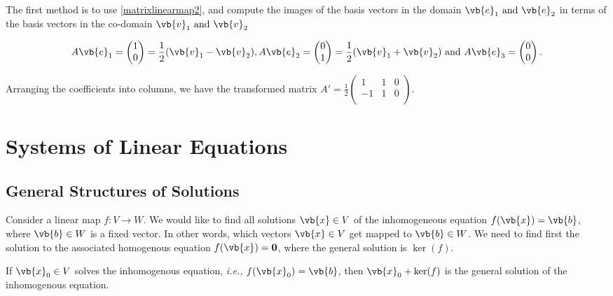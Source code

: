 \documentclass[a4paper,12pt]{report}
\begin{document}
{The first method is to use \cref{matrixlinearmap2}, and compute the images of the basis vectors in the domain \(\vb{e} _{1} \text { and } \vb{e} _{2} \) in terms of the basis vectors in the co-domain \(\vb{v} _{1} \text { and } \vb{v} _{2} \)

\begin{equation}
    A \vb{e} _{1} = \begin{pmatrix}
         1 \\
         0 \\
    \end{pmatrix} = \frac{1}{2}(\vb{v} _{1} - \vb{v} _{2}  ),  A\vb{e} _{2} = \begin{pmatrix}
         0 \\
         1 \\
    \end{pmatrix} = \frac{1}{2} (\vb{v} _{1}+ \vb{v} _{2}  ) \text { and } A\vb{e} _{3} = \begin{pmatrix}
         0 \\
         0 \\
    \end{pmatrix}.
\end{equation}

Arranging the coefficients into columns, we have the transformed matrix \(A' = \frac{1}{2} \begin{pmatrix}
    1 &  1 & 0 \\
    -1 &  1 & 0 \\
\end{pmatrix}\). 
} 


\section{Systems of Linear Equations}

\subsection{General Structures of Solutions}

Consider a linear map \(f:V \to W\). We would like to find all solutions \(\vb{x} \in V\) of the inhomogeneous equation \(f(\vb{x} ) = \vb{b} \), where \(\vb{b} \in W\) is a fixed vector. In other words, which vectors \(\vb{x}  \in V\) get mapped to \(\vb{b} \in W\). We need to find first the solution to the associated homogenous equation \(f(\vb{x} ) = \boldsymbol{0} \), where the general solution is \(\ker (f)\).       

\begin{lemma}
If \(\vb{x} _{0} \in V\) solves the inhomogenous equation, \textit{i.e.,} \(f(\vb{x} _{0} ) = \vb{b}\), then \(\vb{x} _{0} + \ker (f) \) is the general solution of the inhomogenous equation.   
\end{lemma}
\end{document}
